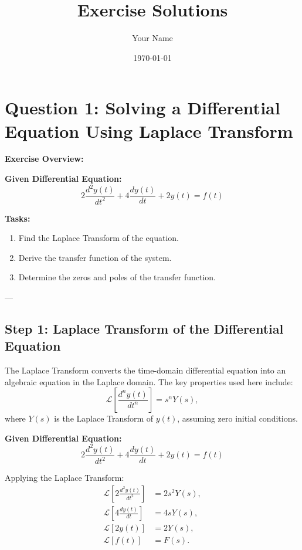 \documentclass[12pt]{article}
\begin{document}
\title{Exercise Solutions}
\author{Your Name}
\date{\today}
\maketitle

\tableofcontents
\newpage

\section*{Question 1: Solving a Differential Equation Using Laplace Transform}

\textbf{Exercise Overview:}

\textbf{Given Differential Equation:}  
\[
2\frac{d^2y(t)}{dt^2} + 4\frac{dy(t)}{dt} + 2y(t) = f(t)
\]

\textbf{Tasks:}
\begin{enumerate}
    \item Find the Laplace Transform of the equation.
    \item Derive the transfer function of the system.
    \item Determine the zeros and poles of the transfer function.
\end{enumerate}

---

\subsection*{Step 1: Laplace Transform of the Differential Equation}
The Laplace Transform converts the time-domain differential equation into an algebraic equation in the Laplace domain. The key properties used here include:
\[
\mathcal{L}\left[\frac{d^n y(t)}{dt^n}\right] = s^n Y(s),
\]
where \( Y(s) \) is the Laplace Transform of \( y(t) \), assuming zero initial conditions.

\textbf{Given Differential Equation:}
\[
2\frac{d^2y(t)}{dt^2} + 4\frac{dy(t)}{dt} + 2y(t) = f(t)
\]

Applying the Laplace Transform:
\begin{align*}
    \mathcal{L}\left[2\frac{d^2y(t)}{dt^2}\right] &= 2s^2 Y(s), \\
    \mathcal{L}\left[4\frac{dy(t)}{dt}\right] &= 4s Y(s), \\
    \mathcal{L}[2y(t)] &= 2Y(s), \\
    \mathcal{L}[f(t)] &= F(s).
\end{align*}
\end{document}
